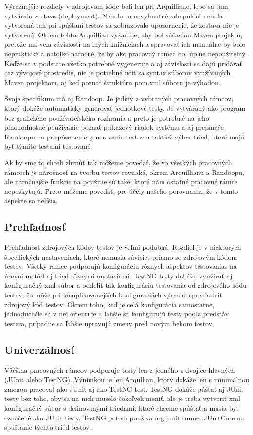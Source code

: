 \documentclass[11pt,twoside,slovak,a4paper]{article}
\begin{document}
	Výraznejšie rozdiely v zdrojovom kóde boli len pri Arquilliane, lebo sa tam vytvárala zostava (deployment). Nebolo to nevyhnutné, ale pokiaľ nebola vytvorená tak pri spúšťaní testov sa zobrazovalo upozornenie, že zostava nie je vytvorená. Okrem tohto Arquillian vyžaduje, aby bol súčasťou Maven projektu, pretože má veľa závislostí na iných knižniciach a spravovať ich manuálne by bolo nepraktické a natoľko náročné, že by ako pracovný rámec bol úplne nepoužiteľný. Keďže sa v podstate všetko potrebné vygeneruje a aj závislosti sa dajú pridávať cez vývojové prostredie, nie je potrebné učiť sa syntax súborov využívaných Maven projektom, aj keď poznať štruktúru pom.xml súboru je výhodou.
	
	Svoje špecifikum má aj Randoop. Je jediný z vybraných pracovných rámcov, ktorý dokáže automaticky generovať jednotkové testy. Je vytváraný ako program bez grafického používateľského rozhrania a preto je potrebné na jeho plnohodnotné používanie poznať príkazový riadok systému a aj prepínače Randoopu na prispôsobenie generovania testov a taktiež výber tried, ktoré majú byť týmito testami testované.
	
	Ak by sme to chceli zhrnúť tak môžeme povedať, že vo všetkých pracovných rámcoch je náročnosť na tvorbu testov rovnaká, okrem Arquillianu a Randoopu, ale náročnejšie funkcie na použitie sú také, ktoré nám ostatné pracovné rámce neposkytujú. Preto môžeme povedať, pre účely našeho porovnania, že v tomto aspekte sa nelíšia.
	
	\subsection{Prehľadnosť}
	Prehľadnosť zdrojových kódov testov je veľmi podobná. Rozdiel je v niektorých špecifických nastaveniach, ktoré nemusia súvisieť priamo so zdrojovým kódom testov. Všetky rámce podporujú konfiguráciu rôznych aspektov testovanias na úrovni metód aj tried rôznymi anotáciami. TestNG testy dokážu využívať aj konfiguračný xml súbor a oddeliť tak konfiguráciu testovania od zdrojového kódu testov, čo môže pri komplikovanejších konfiguráciách výrazne sprehľadniť zdrojový kód testov. Okrem toho, keď je celá konfigurácia samostatne, jednoduchšie sa v nej orientuje a ľahšie sa konfigurujú testy podľa predstáv testera, prípadne sa ľahšie upravujú zmeny pred novým behom testov.
	
	\subsection{Univerzálnosť}
	Väčšina pracovných rámcov podporuje testy len z jedného z dvojice hlavných (JUnit alebo TestNG). Výnimkou je len Arqullian, ktorý dokáže len s minimálnou zmenou pracovať ako JUnit aj ako TestNG test. TestNG dokáže púšťať aj JUnit testy bez toho, aby sa na nich muselo čokoľvek meniť, ale je treba vytvoriť xml konfiguračný súbor s definovanými triedami, ktoré chceme spúšťať a musia byť označené ako JUnit testy. TestNG potom používa org.junit.runner.JUnitCore na spúšťanie týchto tried testov. 
	
\end{document}
